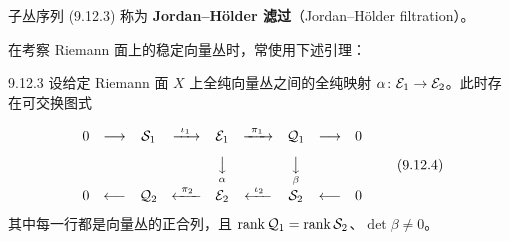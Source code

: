 子丛序列 (9.12.3) 称为 \textbf{Jordan--Hölder 滤过}（Jordan--Hölder filtration）。


在考察 Riemann 面上的稳定向量丛时，常使用下述引理：

\begin{lemma*}{9.12.3}
  设给定 Riemann 面 $X$ 上全纯向量丛之间的全纯映射 $\alpha\colon\mathcal{E}_1\to\mathcal{E}_2$。此时存在可交换图式


  \begin{equation}
    \begin{array}{ccccccccc}
      0&\longrightarrow&\cS_1&\xrightarrow{\ \iota_1\ }&\cE_1&\xrightarrow{\ \pi_1\ }&\cQ_1&\longrightarrow&0\\[8pt]
      &&&&\underset{\alpha}{\big\downarrow}&&\underset{\beta}{\big\downarrow}&&\\[8pt]
      0&\longleftarrow&\cQ_2&\xleftarrow{\ \pi_2\ }&\cE_2&\xleftarrow{\ \iota_2\ }&\cS_2&\longleftarrow&0
    \end{array}
    \tag{9.12.4}
  \end{equation}
  其中每一行都是向量丛的正合列，且 $\operatorname{rank}\mathcal{Q}_1=\operatorname{rank}\mathcal{S}_2$、$\det\beta\ne0$。
\end{lemma*}


